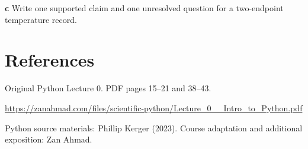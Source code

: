 \documentclass[11pt,letterpaper]{article}
\theoremstyle{definition}\newtheorem{definition}{Definition}\newtheorem{example}{Example}
\numberwithin{equation}{section}
\begin{document}
\textbf{c} Write one supported claim and one unresolved question for a two-endpoint temperature record.

\section*{References}
\noindent\begin{minipage}{\linewidth}
Original Python Lecture 0. PDF pages 15--21 and 38--43.

\url{https://zanahmad.com/files/scientific-python/Lecture_0__Intro_to_Python.pdf}
\end{minipage}\par\medskip
Python source materials: Phillip Kerger (2023). Course adaptation and additional exposition: Zan Ahmad.
\end{document}
